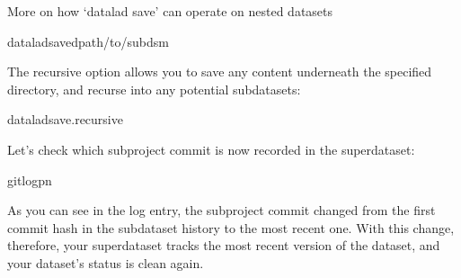 \begin{findoutmore}[label={index-1}, before title={\thetcbcounter\ }, check odd page=true]{More on how ‘datalad save’ can operate on nested datasets}
\begin{sphinxVerbatim}[commandchars=\\\{\}]
dataladsave\PYGZhy{}dpath/to/subds\PYGZhy{}m
\end{sphinxVerbatim}

\sphinxAtStartPar
The recursive option allows you to save any content underneath the specified
directory, and recurse into any potential subdatasets:

\begin{sphinxVerbatim}[commandchars=\\\{\}]
dataladsave.\PYGZhy{}\PYGZhy{}recursive
\end{sphinxVerbatim}


\end{findoutmore}

\sphinxAtStartPar
Let’s check which subproject commit is now recorded in the superdataset:

%
\begin{sphinxVerbatim}[commandchars=\\\{\}]
gitlog\PYGZhy{}p\PYGZhy{}n


\end{sphinxVerbatim}
\sphinxresetverbatimhllines

\sphinxAtStartPar
As you can see in the log entry, the subproject commit changed from the
first commit hash in the subdataset history to the most recent one. With this
change, therefore, your superdataset tracks the most recent version of
the  dataset, and your dataset’s status is clean again.

